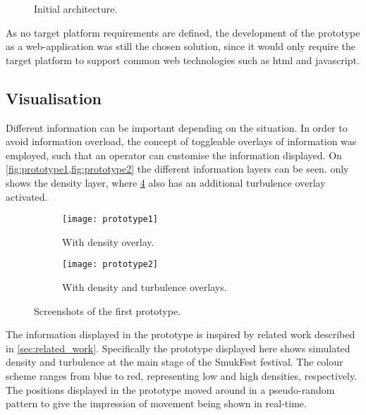 \begin{figure}[htbp]
    \centering
    \caption{Initial architecture.}
    \label{fig:init_architecture}
\end{figure}

As no target platform requirements are defined, the development of the prototype as a web-application was still the chosen solution, since it would only require the target platform to support common web technologies such as html and javascript.

\subsection{Visualisation}
Different information can be important depending on the situation. In order to avoid information overload, the concept of toggleable overlays of information was employed, such that an operator can customise the information displayed. On \cref{fig:prototype1,fig:prototype2} the different information layers can be seen.  only shows the density layer, where \cref{fig:prototype2} also has an additional turbulence overlay activated.

\begin{figure}[htbp]
\centering
\begin{subfigure}{.48\textwidth}
    \texttt{[image: prototype1]}
    \caption{With density overlay.}\label{fig:prototype1}
\end{subfigure}
\quad %
\begin{subfigure}{.48\textwidth}
    \texttt{[image: prototype2]}
    \caption{With density and turbulence overlays.}\label{fig:prototype2}
\end{subfigure}
\caption{Screenshots of the first prototype.}
\end{figure}

The information displayed in the prototype is inspired by related work described in \cref{sec:related_work}. Specifically the prototype displayed here shows simulated density and turbulence at the main stage of the SmukFest festival. The colour scheme ranges from blue to red, representing low and high densities, respectively. The positions displayed in the prototype moved around in a pseudo-random pattern to give the impression of movement being shown in real-time.